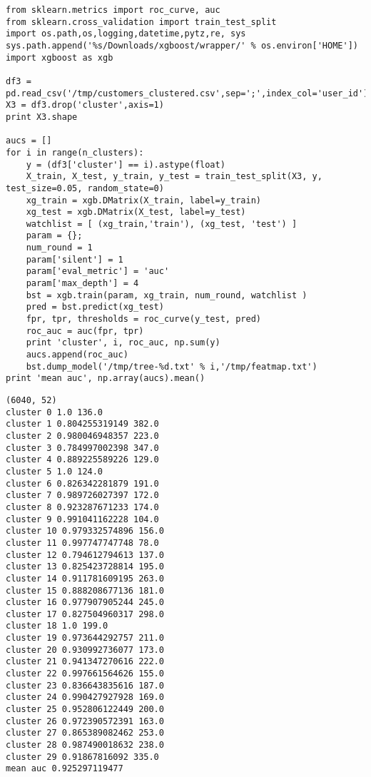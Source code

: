 \documentclass[12pt,fleqn]{article}\usepackage{../common}
\begin{document}
\begin{verbatim}
from sklearn.metrics import roc_curve, auc
from sklearn.cross_validation import train_test_split
import os.path,os,logging,datetime,pytz,re, sys
sys.path.append('%s/Downloads/xgboost/wrapper/' % os.environ['HOME'])
import xgboost as xgb

df3 = pd.read_csv('/tmp/customers_clustered.csv',sep=';',index_col='user_id')
X3 = df3.drop('cluster',axis=1)
print X3.shape

aucs = []
for i in range(n_clusters):
    y = (df3['cluster'] == i).astype(float)
    X_train, X_test, y_train, y_test = train_test_split(X3, y, test_size=0.05, random_state=0)
    xg_train = xgb.DMatrix(X_train, label=y_train)
    xg_test = xgb.DMatrix(X_test, label=y_test)    
    watchlist = [ (xg_train,'train'), (xg_test, 'test') ]    
    param = {}; 
    num_round = 1
    param['silent'] = 1
    param['eval_metric'] = 'auc'
    param['max_depth'] = 4
    bst = xgb.train(param, xg_train, num_round, watchlist )
    pred = bst.predict(xg_test)
    fpr, tpr, thresholds = roc_curve(y_test, pred)
    roc_auc = auc(fpr, tpr)
    print 'cluster', i, roc_auc, np.sum(y)
    aucs.append(roc_auc)
    bst.dump_model('/tmp/tree-%d.txt' % i,'/tmp/featmap.txt')
print 'mean auc', np.array(aucs).mean()
\end{verbatim}

\begin{verbatim}
(6040, 52)
cluster 0 1.0 136.0
cluster 1 0.804255319149 382.0
cluster 2 0.980046948357 223.0
cluster 3 0.784997002398 347.0
cluster 4 0.889225589226 129.0
cluster 5 1.0 124.0
cluster 6 0.826342281879 191.0
cluster 7 0.989726027397 172.0
cluster 8 0.923287671233 174.0
cluster 9 0.991041162228 104.0
cluster 10 0.979332574896 156.0
cluster 11 0.997747747748 78.0
cluster 12 0.794612794613 137.0
cluster 13 0.825423728814 195.0
cluster 14 0.911781609195 263.0
cluster 15 0.888208677136 181.0
cluster 16 0.977907905244 245.0
cluster 17 0.827504960317 298.0
cluster 18 1.0 199.0
cluster 19 0.973644292757 211.0
cluster 20 0.930992736077 173.0
cluster 21 0.941347270616 222.0
cluster 22 0.997661564626 155.0
cluster 23 0.836643835616 187.0
cluster 24 0.990427927928 169.0
cluster 25 0.952806122449 200.0
cluster 26 0.972390572391 163.0
cluster 27 0.865389082462 253.0
cluster 28 0.987490018632 238.0
cluster 29 0.91867816092 335.0
mean auc 0.925297119477
\end{verbatim}
\end{document}
